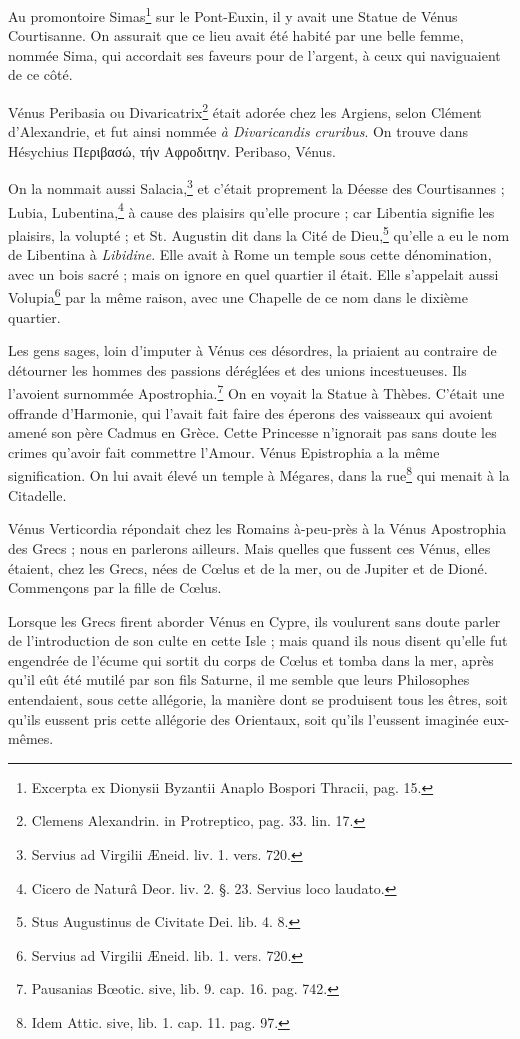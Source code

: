 \documentclass[a4paper, 18pt, oneside]{article}
\begin{document}
Au promontoire Simas\footnote{Excerpta ex Dionysii Byzantii Anaplo Bospori Thracii, pag. 15.} sur le Pont-Euxin, il y avait une Statue de Vénus Courtisanne. On assurait que ce lieu avait été habité par une belle femme, nommée Sima, qui accordait ses faveurs pour de l'argent, à ceux qui naviguaient de ce côté.

Vénus Peribasia ou Divaricatrix\footnote{Clemens Alexandrin. in Protreptico, pag. 33. lin. 17.} était adorée chez les Argiens, selon Clément d'Alexandrie, et fut ainsi nommée \emph{à Divaricandis cruribus}. On trouve dans Hésychius Περιβασώ, τήν Αφροδιτην. Peribaso, Vénus.

On la nommait aussi Salacia,\footnote{Servius ad Virgilii Æneid. liv. 1. vers. 720.} et c'était proprement la Déesse des Courtisannes ; Lubia, Lubentina,\footnote{Cicero de Naturâ Deor. liv. 2. §. 23. Servius loco laudato.} à cause des plaisirs qu'elle procure ; car Libentia signifie les plaisirs, la volupté ; et St. Augustin dit dans la Cité de Dieu,\footnote{Stus Augustinus de Civitate Dei. lib. 4. 8.} qu'elle a eu le nom de Libentina à \emph{Libidine}. Elle avait à Rome un temple sous cette dénomination, avec un bois sacré ; mais on ignore en quel quartier il était. Elle s'appelait aussi Volupia\footnote{Servius ad Virgilii Æneid. lib. 1. vers. 720.} par la même raison, avec une Chapelle de ce nom dans le dixième quartier.

Les gens sages, loin d'imputer à Vénus ces désordres, la priaient au contraire de détourner les hommes des passions déréglées et des unions incestueuses. Ils l'avoient surnommée Apostrophia.\footnote{Pausanias Bœotic. sive, lib. 9. cap. 16. pag. 742.} On en voyait la Statue à Thèbes. C'était une offrande d'Harmonie, qui l'avait fait faire des éperons des vaisseaux qui avoient amené son père Cadmus en Grèce. Cette Princesse n'ignorait pas sans doute les crimes qu'avoir fait commettre l'Amour. Vénus Epistrophia a la même signification. On lui avait élevé un temple à Mégares, dans la rue\footnote{Idem Attic. sive, lib. 1. cap. 11. pag. 97.} qui menait à la Citadelle.

Vénus Verticordia répondait chez les Romains à-peu-près à la Vénus Apostrophia des Grecs ; nous en parlerons ailleurs. Mais quelles que fussent ces Vénus, elles étaient, chez les Grecs, nées de Cœlus et de la mer, ou de Jupiter et de Dioné. Commençons par la fille de Cœlus.

Lorsque les Grecs firent aborder Vénus en Cypre, ils voulurent sans doute parler de l'introduction de son culte en cette Isle ; mais quand ils nous disent qu'elle fut engendrée de l'écume qui sortit du corps de Cœlus et tomba dans la mer, après qu'il eût été mutilé par son fils Saturne, il me semble que leurs Philosophes entendaient, sous cette allégorie, la manière dont se produisent tous les êtres, soit qu'ils eussent pris cette allégorie des Orientaux, soit qu'ils l'eussent imaginée eux-mêmes.
\end{document}
